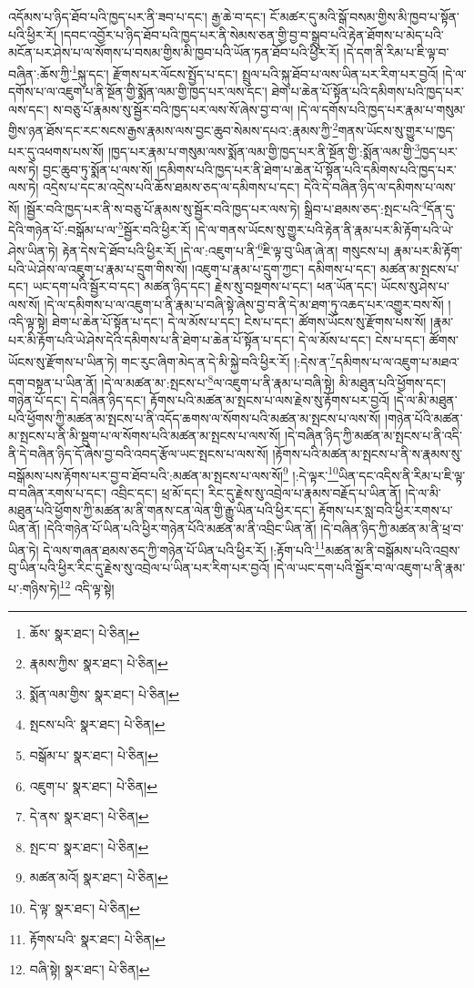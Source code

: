 འདོམས་པ་ཉིད་ཐོབ་པའི་ཁྱད་པར་ནི་ཟབ་པ་དང་། རྒྱ་ཆེ་བ་དང་། ངོ་མཚར་དུ་མའི་སྒོ་བསམ་གྱིས་མི་ཁྱབ་པ་སྟོན་པའི་ཕྱིར་རོ། །དབང་འབྱོར་པ་ཉིད་ཐོབ་པའི་ཁྱད་པར་ནི་སེམས་ཅན་གྱི་བྱ་བ་སྒྲུབ་པའི་རྟེན་ཐོགས་པ་མེད་པའི་མངོན་པར་ཤེས་པ་ལ་སོགས་པ་བསམ་གྱིས་མི་ཁྱབ་པའི་ཡོན་ཏན་ཐོབ་པའི་ཕྱིར་རོ། །དེ་དག་ནི་རིམ་པ་ཇི་ལྟ་བ་བཞིན་:ཆོས་ཀྱི་\footnote{ཆོས་  སྣར་ཐང་།  པེ་ཅིན། }སྐུ་དང་། རྫོགས་པར་ལོངས་སྤྱོད་པ་དང་། སྤྲུལ་པའི་སྐུ་ཐོབ་པ་ལས་ཡིན་པར་རིག་པར་བྱའོ། །དེ་ལ་དགོས་པ་ལ་འཇུག་པ་ནི་སྔོན་གྱི་སྨོན་ལམ་གྱི་ཁྱད་པར་ལས་དང་། ཐེག་པ་ཆེན་པོ་སྟོན་པའི་དམིགས་པའི་ཁྱད་པར་ལས་དང་། ས་བཅུ་པོ་རྣམས་སུ་སྦྱོར་བའི་ཁྱད་པར་ལས་སོ་ཞེས་བྱ་བ་ལ། །དེ་ལ་དགོས་པའི་ཁྱད་པར་རྣམ་པ་གསུམ་གྱིས་ཉན་ཐོས་དང་རང་སངས་རྒྱས་རྣམས་ལས་བྱང་ཆུབ་སེམས་དཔའ་:རྣམས་ཀྱི་\footnote{རྣམས་ཀྱིས་  སྣར་ཐང་།  པེ་ཅིན། }གནས་ཡོངས་སུ་གྱུར་པ་ཁྱད་པར་དུ་འཕགས་པས་སོ། །ཁྱད་པར་རྣམ་པ་གསུམ་ལས་སྨོན་ལམ་གྱི་ཁྱད་པར་ནི་སྔོན་གྱི་:སྨོན་ལམ་གྱི་\footnote{སྨོན་ལམ་གྱིས་  སྣར་ཐང་།  པེ་ཅིན། }ཁྱད་པར་ལས་ཏེ། བྱང་ཆུབ་ཏུ་སྨོན་པ་ལས་སོ། །དམིགས་པའི་ཁྱད་པར་ནི་ཐེག་པ་ཆེན་པོ་སྟོན་པའི་དམིགས་པའི་ཁྱད་པར་ལས་ཏེ། འདྲེས་པ་དང་མ་འདྲེས་པའི་ཆོས་ཐམས་ཅད་ལ་དམིགས་པ་དང་། དེའི་དེ་བཞིན་ཉིད་ལ་དམིགས་པ་ལས་སོ། །སྦྱོར་བའི་ཁྱད་པར་ནི་ས་བཅུ་པོ་རྣམས་སུ་སྦྱོར་བའི་ཁྱད་པར་ལས་ཏེ། སྒྲིབ་པ་ཐམས་ཅད་:སྤང་པའི་\footnote{སྤངས་པའི་  སྣར་ཐང་།  པེ་ཅིན། }དོན་དུ་དེའི་གཉེན་པོ་:བསྒོམ་པ་ལ་\footnote{བསྒོམ་པ་  སྣར་ཐང་།  པེ་ཅིན། }སྦྱོར་བའི་ཕྱིར་རོ། །དེ་ལ་གནས་ཡོངས་སུ་གྱུར་པའི་རྟེན་ནི་རྣམ་པར་མི་རྟོག་པའི་ཡེ་ཤེས་ཡིན་ཏེ། རྟེན་དེས་དེ་ཐོབ་པའི་ཕྱིར་རོ། །དེ་ལ་:འཇུག་པ་ནི་\footnote{འཇུག་པ་  སྣར་ཐང་།  པེ་ཅིན། }ཇི་ལྟ་བུ་ཡིན་ཞེ་ན། གསུངས་པ། རྣམ་པར་མི་རྟོག་པའི་ཡེ་ཤེས་ལ་འཇུག་པ་རྣམ་པ་དྲུག་གིས་སོ། །འཇུག་པ་རྣམ་པ་དྲུག་ཀྱང་། དམིགས་པ་དང་། མཚན་མ་སྤངས་པ་དང་། ཡང་དག་པའི་སྦྱོར་བ་དང་། མཚན་ཉིད་དང་། རྗེས་སུ་བསྔགས་པ་དང་། ཕན་ཡོན་དང་། ཡོངས་སུ་ཤེས་པ་ལས་སོ། །དེ་ལ་དམིགས་པ་ལ་འཇུག་པ་ནི་རྣམ་པ་བཞི་སྟེ་ཞེས་བྱ་བ་ནི་དེ་མ་ཐག་ཏུ་འཆད་པར་འགྱུར་བས་སོ། །འདི་ལྟ་སྟེ། ཐེག་པ་ཆེན་པོ་སྟོན་པ་དང་། དེ་ལ་མོས་པ་དང་། ངེས་པ་དང་། ཚོགས་ཡོངས་སུ་རྫོགས་པས་སོ། །རྣམ་པར་མི་རྟོག་པའི་ཡེ་ཤེས་དེའི་དམིགས་པ་ནི་ཐེག་པ་ཆེན་པོ་སྟོན་པ་དང་། དེ་ལ་མོས་པ་དང་། ངེས་པ་དང་། ཚོགས་ཡོངས་སུ་རྫོགས་པ་ཡིན་ཏེ། གང་རུང་ཞིག་མེད་ན་དེ་མི་སྐྱེ་བའི་ཕྱིར་རོ། །:དེས་ན་\footnote{དེ་ནས་  སྣར་ཐང་།  པེ་ཅིན། }དམིགས་པ་ལ་འཇུག་པ་མཐའ་དག་བསྟན་པ་ཡིན་ནོ། །དེ་ལ་མཚན་མ་:སྤངས་པ་\footnote{སྤང་བ་  སྣར་ཐང་།  པེ་ཅིན། }ལ་འཇུག་པ་ནི་རྣམ་པ་བཞི་སྟེ། མི་མཐུན་པའི་ཕྱོགས་དང་། གཉེན་པོ་དང་། དེ་བཞིན་ཉིད་དང་། རྟོགས་པའི་མཚན་མ་སྤངས་པ་ལས་རྗེས་སུ་རྟོགས་པར་བྱའོ། །དེ་ལ་མི་མཐུན་པའི་ཕྱོགས་ཀྱི་མཚན་མ་སྤངས་པ་ནི་འདོད་ཆགས་ལ་སོགས་པའི་མཚན་མ་སྤངས་པ་ལས་སོ། །གཉེན་པོའི་མཚན་མ་སྤངས་པ་ནི་མི་སྡུག་པ་ལ་སོགས་པའི་མཚན་མ་སྤངས་པ་ལས་སོ། །དེ་བཞིན་ཉིད་ཀྱི་མཚན་མ་སྤངས་པ་ནི་འདི་ནི་དེ་བཞིན་ཉིད་དོ་ཞེས་བྱ་བའི་འབད་རྩོལ་ཡང་སྤངས་པ་ལས་སོ། །རྟོགས་པའི་མཚན་མ་སྤངས་པ་ནི་ས་རྣམས་སུ་བསྒོམས་པས་རྟོགས་པར་བྱ་བ་ཐོབ་པའི་:མཚན་མ་སྤངས་པ་ལས་སོ།\footnote{མཚན་མའོ།  སྣར་ཐང་།  པེ་ཅིན། } །:དེ་ལྟར་\footnote{དེ་ལྟ་  སྣར་ཐང་།  པེ་ཅིན། }ཡིན་དང་འདིས་ནི་རིམ་པ་ཇི་ལྟ་བ་བཞིན་རགས་པ་དང་། འབྲིང་དང་། ཕྲ་མོ་དང་། རིང་དུ་རྗེས་སུ་འབྲེལ་པ་རྣམས་བརྗོད་པ་ཡིན་ནོ། །དེ་ལ་མི་མཐུན་པའི་ཕྱོགས་ཀྱི་མཚན་མ་ནི་གནས་ངན་ལེན་གྱི་རྒྱུ་ཡིན་པའི་ཕྱིར་དང་། རྟོགས་པར་སླ་བའི་ཕྱིར་རགས་པ་ཡིན་ནོ། །དེའི་གཉེན་པོ་ཡིན་པའི་ཕྱིར་གཉེན་པོའི་མཚན་མ་ནི་འབྲིང་ཡིན་ནོ། །དེ་བཞིན་ཉིད་ཀྱི་མཚན་མ་ནི་ཕྲ་བ་ཡིན་ཏེ། དེ་ལས་གཞན་ཐམས་ཅད་ཀྱི་གཉེན་པོ་ཡིན་པའི་ཕྱིར་རོ། །:རྟོག་པའི་\footnote{རྟོགས་པའི་  སྣར་ཐང་།  པེ་ཅིན། }མཚན་མ་ནི་བསྒོམས་པའི་འབྲས་བུ་ཡིན་པའི་ཕྱིར་རིང་དུ་རྗེས་སུ་འབྲེལ་པ་ཡིན་པར་རིག་པར་བྱའོ། །དེ་ལ་ཡང་དག་པའི་སྦྱོར་བ་ལ་འཇུག་པ་ནི་རྣམ་པ་:གཉིས་ཏེ།\footnote{བཞི་སྟེ།  སྣར་ཐང་།  པེ་ཅིན། } འདི་ལྟ་སྟེ། 